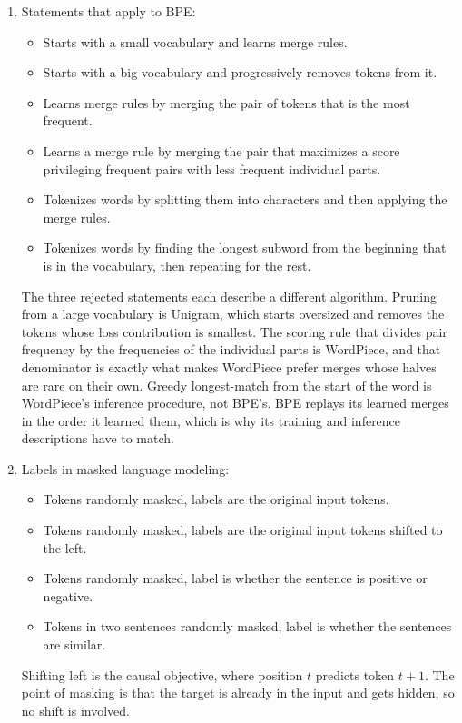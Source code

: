 \documentclass[11pt]{article}
\begin{document}
\begin{enumerate}
  \item Statements that apply to BPE:
        \begin{itemize}
          \item[{[X]}] Starts with a small vocabulary and learns merge rules.
          \item[{[\ ]}] Starts with a big vocabulary and progressively removes tokens from it.
          \item[{[X]}] Learns merge rules by merging the pair of tokens that is the most frequent.
          \item[{[\ ]}] Learns a merge rule by merging the pair that maximizes a score privileging frequent
                pairs with less frequent individual parts.
          \item[{[X]}] Tokenizes words by splitting them into characters and then applying the merge rules.
          \item[{[\ ]}] Tokenizes words by finding the longest subword from the beginning that is in the
                vocabulary, then repeating for the rest.
        \end{itemize}
        The three rejected statements each describe a different algorithm. Pruning from a large vocabulary is
        Unigram, which starts oversized and removes the tokens whose loss contribution is smallest. The scoring
        rule that divides pair frequency by the frequencies of the individual parts is WordPiece, and that
        denominator is exactly what makes WordPiece prefer merges whose halves are rare on their own. Greedy
        longest-match from the start of the word is WordPiece's inference procedure, not BPE's. BPE replays its
        learned merges in the order it learned them, which is why its training and inference descriptions have
        to match.

  \item Labels in masked language modeling:
        \begin{itemize}
          \item[{[X]}] Tokens randomly masked, labels are the original input tokens.
          \item[{[\ ]}] Tokens randomly masked, labels are the original input tokens shifted to the left.
          \item[{[\ ]}] Tokens randomly masked, label is whether the sentence is positive or negative.
          \item[{[\ ]}] Tokens in two sentences randomly masked, label is whether the sentences are similar.
        \end{itemize}
        Shifting left is the causal objective, where position $t$ predicts token $t+1$. The point of masking is
        that the target is already in the input and gets hidden, so no shift is involved.


\end{enumerate}
\end{document}
